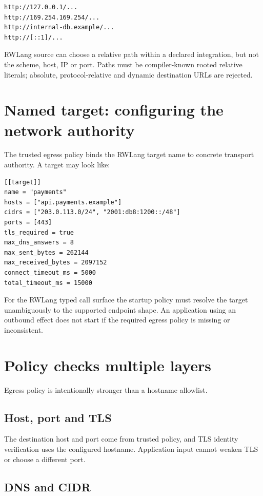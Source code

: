 \begin{lstlisting}
http://127.0.0.1/...
http://169.254.169.254/...
http://internal-db.example/...
http://[::1]/...
\end{lstlisting}

RWLang source can choose a relative path within a declared integration, but not the scheme, host, IP or port. Paths must be compiler-known rooted relative literals; absolute, protocol-relative and dynamic destination URLs are rejected.

\section{Named target: configuring the network authority}

The trusted egress policy binds the RWLang target name to concrete transport authority. A target may look like:

\begin{lstlisting}
[[target]]
name = "payments"
hosts = ["api.payments.example"]
cidrs = ["203.0.113.0/24", "2001:db8:1200::/48"]
ports = [443]
tls_required = true
max_dns_answers = 8
max_sent_bytes = 262144
max_received_bytes = 2097152
connect_timeout_ms = 5000
total_timeout_ms = 15000
\end{lstlisting}

For the RWLang typed call surface the startup policy must resolve the target unambiguously to the supported endpoint shape. An application using an outbound effect does not start if the required egress policy is missing or inconsistent.

\section{Policy checks multiple layers}

Egress policy is intentionally stronger than a hostname allowlist.

\subsection*{Host, port and TLS}

The destination host and port come from trusted policy, and TLS identity verification uses the configured hostname. Application input cannot weaken TLS or choose a different port.

\subsection*{DNS and CIDR}

